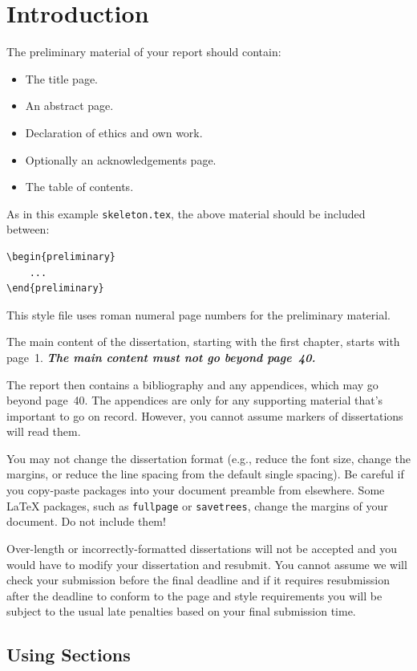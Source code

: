 \documentclass[logo,bsc,singlespacing,parskip,online]{infthesis}
\begin{document}
\chapter{Introduction}

The preliminary material of your report should contain:
\begin{itemize}
\item
The title page.
\item
An abstract page.
\item
Declaration of ethics and own work.
\item
Optionally an acknowledgements page.
\item
The table of contents.
\end{itemize}

As in this example \texttt{skeleton.tex}, the above material should be
included between:
\begin{verbatim}
\begin{preliminary}
    ...
\end{preliminary}
\end{verbatim}
This style file uses roman numeral page numbers for the preliminary material.

The main content of the dissertation, starting with the first chapter,
starts with page~1. \emph{\textbf{The main content must not go beyond page~40.}}

The report then contains a bibliography and any appendices, which may go beyond
page~40. The appendices are only for any supporting material that's important to
go on record. However, you cannot assume markers of dissertations will read them.

You may not change the dissertation format (e.g., reduce the font size, change
the margins, or reduce the line spacing from the default single spacing). Be
careful if you copy-paste packages into your document preamble from elsewhere.
Some \LaTeX{} packages, such as \texttt{fullpage} or \texttt{savetrees}, change
the margins of your document. Do not include them!

Over-length or incorrectly-formatted dissertations will not be accepted and you
would have to modify your dissertation and resubmit. You cannot assume we will
check your submission before the final deadline and if it requires resubmission
after the deadline to conform to the page and style requirements you will be
subject to the usual late penalties based on your final submission time.

\section{Using Sections}
\end{document}
